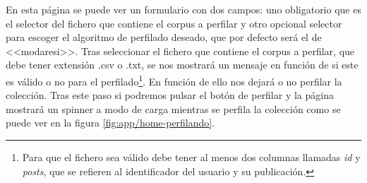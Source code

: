 En esta página se puede ver un formulario con dos campos: uno obligatorio que es el selector del fichero que contiene el corpus a perfilar y otro opcional selector para escoger el algoritmo de perfilado deseado, que por defecto será el de <<modaresi>>. Tras seleccionar el fichero que contiene el corpus a perfilar, que debe tener extensión .csv o .txt, se nos mostrará un mensaje en función de si este es válido o no para el perfilado\footnote{Para que el fichero sea válido debe tener al menos dos columnas llamadas \textit{id} y \textit{posts}, que se refieren al identificador del usuario y su publicación.}. En función de ello nos dejará o no perfilar la colección. Tras este paso si podremos pulsar el botón de perfilar y la página mostrará un spinner a modo de carga mientras se perfila la colección como se puede ver en la figura \ref{fig:app/home-perfilando}.

